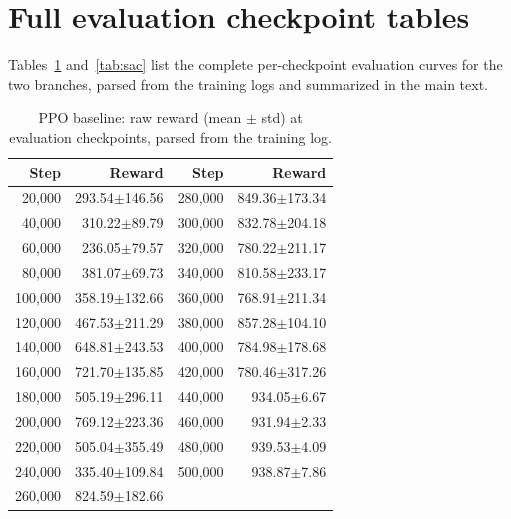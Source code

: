 \documentclass[conference]{IEEEtran}
\begin{document}
\appendix

\section{Full evaluation checkpoint tables}
\label{app:tables}
Tables~\ref{tab:ppo} and~\ref{tab:sac} list the complete per-checkpoint
evaluation curves for the two branches, parsed from the training logs and
summarized in the main text.

\begin{table}[t]
\caption{PPO baseline: raw reward (mean $\pm$ std) at evaluation checkpoints,
parsed from the training log.}
\label{tab:ppo}
\centering
\small
\begin{tabular}{rr@{\hspace{6pt}}r@{\hspace{6pt}}r}
\toprule
Step & Reward & Step & Reward \\
\midrule
20{,}000  & 293.54$\pm$146.56 & 280{,}000 & 849.36$\pm$173.34 \\
40{,}000  & 310.22$\pm$89.79  & 300{,}000 & 832.78$\pm$204.18 \\
60{,}000  & 236.05$\pm$79.57  & 320{,}000 & 780.22$\pm$211.17 \\
80{,}000  & 381.07$\pm$69.73  & 340{,}000 & 810.58$\pm$233.17 \\
100{,}000 & 358.19$\pm$132.66 & 360{,}000 & 768.91$\pm$211.34 \\
120{,}000 & 467.53$\pm$211.29 & 380{,}000 & 857.28$\pm$104.10 \\
140{,}000 & 648.81$\pm$243.53 & 400{,}000 & 784.98$\pm$178.68 \\
160{,}000 & 721.70$\pm$135.85 & 420{,}000 & 780.46$\pm$317.26 \\
180{,}000 & 505.19$\pm$296.11 & 440{,}000 & 934.05$\pm$6.67 \\
200{,}000 & 769.12$\pm$223.36 & 460{,}000 & 931.94$\pm$2.33 \\
220{,}000 & 505.04$\pm$355.49 & 480{,}000 & 939.53$\pm$4.09 \\
240{,}000 & 335.40$\pm$109.84 & 500{,}000 & 938.87$\pm$7.86 \\
260{,}000 & 824.59$\pm$182.66 & & \\
\bottomrule
\end{tabular}
\end{table}
\end{document}
